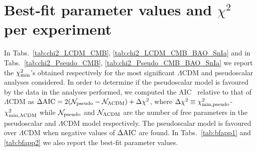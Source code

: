 \documentclass[a4paper,11pt]{article}
\begin{document}





\section{Best-fit parameter values and $\chi^2$ per experiment}\label{app:bfchi2}

 In Tabs.~\ref{tab:chi2_LCDM_CMB},  \ref{tab:chi2_LCDM_CMB_BAO_SnIa} and in Tabs.~\ref{tab:chi2_Pseudo_CMB},  \ref{tab:chi2_Pseudo_CMB_BAO_SnIa} we report the $\chi^2_{\rm{min}}$’s obtained respectively for the most significant $\Lambda$CDM and pseudoscalar analyses considered. In order to determine if the pseudoscalar model is favoured by the data in the analyses performed, we computed the AIC~\cite{Akaike1974ANL} relative to that of $\Lambda$CDM as $\Delta \rm{AIC} = 2(\mathcal{N}_{\rm{pseudo}}-\mathcal{N}_{\Lambda\rm{CDM}})+\Delta \chi^2$, where $\Delta \chi^2 \equiv \chi^2_{\rm min,pseudo}$-$\chi^2_{\rm min, \Lambda CDM}$ while $\mathcal{N}_{\rm{pseudo}}$ and $\mathcal{N}_{\Lambda\rm{CDM}}$ are the number of free parameters in the pseudoscalar and $\Lambda$CDM model respectively. The pseudoscalar model is favoured over $\Lambda$CDM when negative values of $\Delta \rm{AIC}$ are found. In Tabs.~\ref{tab:bfapp1} and \ref{tab:bfapp2} we also report the best-fit parameter values.

\end{document}
